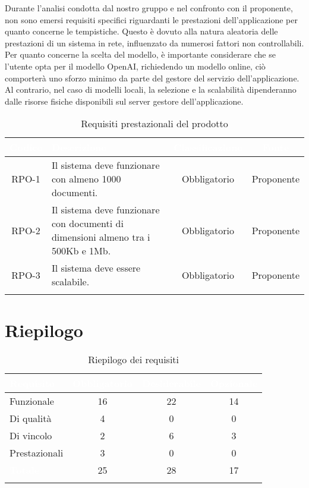 Durante l'analisi condotta dal nostro gruppo e nel confronto con il proponente, non sono emersi requisiti specifici riguardanti le prestazioni dell'applicazione per quanto concerne le tempistiche. Questo è dovuto alla natura aleatoria delle prestazioni di un sistema in rete, influenzato da numerosi fattori non controllabili.\\Per quanto concerne la scelta del modello, è importante considerare che se l'utente opta per il modello OpenAI, richiedendo un modello online, ciò comporterà uno sforzo minimo da parte del gestore del servizio dell'applicazione. Al contrario, nel caso di modelli locali, la selezione e la scalabilità dipenderanno dalle risorse fisiche disponibili sul server gestore dell'applicazione.\\
\begingroup
\setlength{\tabcolsep}{10pt}
\renewcommand{\arraystretch}{1.5}
\begin{xltabular}{\textwidth}{| c | X | c | c |}
    \hline
     \textbf{\textcolor{white}{Codice}} & \textbf{\textcolor{white}{Descrizione}} & \textbf{\textcolor{white}{Classificazione}} & \textbf{\textcolor{white}{Fonte}}\\
    \hline
    \endhead
    RPO-1 & Il sistema deve funzionare con almeno 1000 documenti.  & Obbligatorio & Proponente\\
    \hline
    RPO-2 & Il sistema deve funzionare con documenti di dimensioni almeno tra i 500Kb e 1Mb. & Obbligatorio & Proponente\\
    \hline
    RPO-3 & Il sistema deve essere scalabile. & Obbligatorio & Proponente\\
    \hline
     \caption{Requisiti prestazionali del prodotto}
    \label{tab:reqpre}
\end{xltabular}
\endgroup

\section{Riepilogo}
\begingroup
\setlength{\tabcolsep}{10pt}
\renewcommand{\arraystretch}{1.5}
\begin{xltabular}{\textwidth}{| X | c | c | c |}
    \hline
     \textbf{\textcolor{white}{Requisito}} & \textbf{\textcolor{white}{Obbligatorio}} & \textbf{\textcolor{white}{Desiderabile}} & \textbf{\textcolor{white}{Opzionale}}\\
    \hline
    \endhead
    Funzionale & 16 & 22 & 14 \\
    \hline
    Di qualità & 4 & 0 & 0 \\
    \hline
    Di vincolo & 2 & 6 & 3 \\
    \hline
    Prestazionali & 3 & 0 & 0 \\
    \hline
     \textbf{\textcolor{white}{Totale}} & 25 & 28 & 17 \\
    \hline
    
     \caption{Riepilogo dei requisiti}
    \label{tab:riepilogo}
\end{xltabular}
\endgroup

